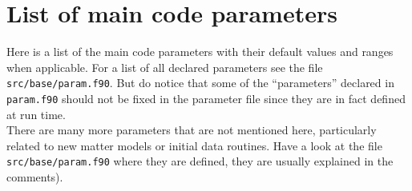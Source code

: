 \documentclass[12pt]{article}
\begin{document}

\section{List of main code parameters}
\label{sec:parameters}

Here is a list of the main code parameters with their default values
and ranges when applicable.  For a list of all declared parameters see
the file \texttt{src/base/param.f90}.  But do notice that some of the
``parameters'' declared in \texttt{param.f90} should not be fixed in
the parameter file since they are in fact defined at run time. \\

There are many more parameters that are not mentioned here,
particularly related to new matter models or initial data routines.
Have a look at the file \texttt{src/base/param.f90} where they are
defined, they are usually explained in the comments). \\
\end{document}
